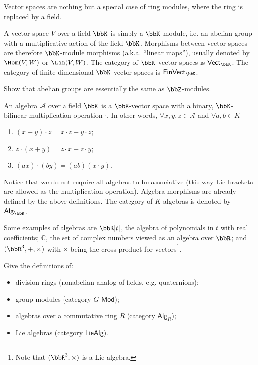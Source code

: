 Vector spaces are nothing but a special case of ring modules, where
the ring is replaced by a field.
\begin{defn}
    A vector space $V$ over a field $\bbK$ is simply a $\bbK$-module, i.e.
    an abelian group with a multiplicative action of the field $\bbK$. Morphisms
    between vector spaces are therefore $\bbK$-module morphisms (a.k.a.
    ``linear maps''), usually denoted by $\Hom(V,W)$ or $\Lin(V,W)$. The category of $\bbK$-vector spaces is $\mathsf{Vect}_{\bbK}$.
    The category of finite-dimensional $\bbK$-vector spaces is $\mathsf{FinVect}_{\bbK}$.
\end{defn}
\begin{xca}
    Show that abelian groups are essentially the same as $\bbZ$-modules.
\end{xca}
\begin{defn}
    An algebra $\mathcal{A}$ over a field $\bbK$ is a $\bbK$-vector space
    with a binary, $\bbK$-bilinear multiplication operation $\cdot$. In
    other words, $\forall x,y,z\in\mathcal{A}$ and $\forall a,b\in K$ 
    \begin{enumerate}
        \item $(x+y)\cdot z=x\cdot z+y\cdot z$;
        \item $z\cdot(x+y)=z\cdot x+z\cdot y$;
        \item $(ax)\cdot(by)=(ab)(x\cdot y)$.
    \end{enumerate}
\end{defn}
Notice that we do not require all algebras to be associative (this
way Lie brackets are allowed as the multiplication operation). Algebra
morphisms are already defined by the above definitions. The category
of $K$-algebras is denoted by $\mathsf{Alg}_{\bbK}$.
\begin{example}
    Some examples of algebras are $\bbR [t]$, the algebra of polynomials
    in $t$ with real coefficients; $\mathbb{C}$, the set of complex
    numbers viewed as an algebra over $\bbR $; and $(\bbR^{3},+,\times)$
    with $\times$ being the cross product for vectors\footnote{Note that $(\bbR^{3},\times)$ is a Lie algebra.}.
\end{example}
\begin{xca}
    Give the definitions of:
    \begin{itemize}
        \item division rings (nonabelian analog of fields, e.g. quaternions);
        \item group modules (category $G\text{-}\mathsf{Mod}$);
        \item algebras over a commutative ring $R$ (category $\mathsf{Alg}_{R}$);
        \item Lie algebras (category $\mathsf{LieAlg})$.
    \end{itemize}
\end{xca}


